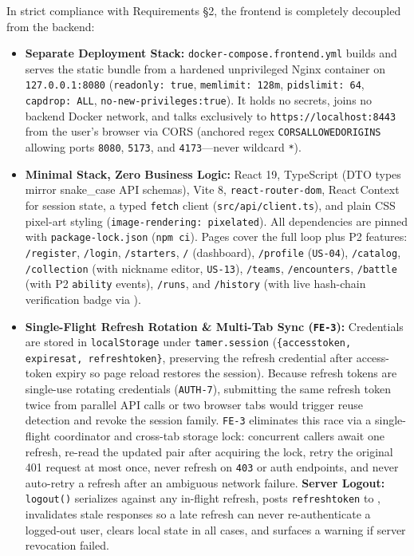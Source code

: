 \documentclass[10.5pt,a4paper]{article}
\DeclareRobustCommand{\code}[1]{\begingroup\def\_{\textunderscore\allowbreak}\texttt{#1}\endgroup}
\begin{document}
In strict compliance with Requirements §2, the frontend is completely decoupled from the backend:
\begin{itemize}
  \item \textbf{Separate Deployment Stack:} \code{docker-compose.frontend.yml} builds and serves the static bundle from a hardened unprivileged Nginx container on \code{127.0.0.1:8080} (\code{read\_only: true}, \code{mem\_limit: 128m}, \code{pids\_limit: 64}, \code{cap\_drop: ALL}, \code{no-new-privileges:true}). It holds no secrets, joins no backend Docker network, and talks exclusively to \code{https://localhost:8443} from the user's browser via CORS (anchored regex \code{CORS\_ALLOWED\_ORIGINS} allowing ports \code{8080}, \code{5173}, and \code{4173}—never wildcard \code{*}).
  \item \textbf{Minimal Stack, Zero Business Logic:} React 19, TypeScript (DTO types mirror snake\_case API schemas), Vite 8, \code{react-router-dom}, React Context for session state, a typed \code{fetch} client (\code{src/api/client.ts}), and plain CSS pixel-art styling (\code{image-rendering: pixelated}). All dependencies are pinned with \code{package-lock.json} (\code{npm ci}). Pages cover the full loop plus P2 features: \code{/register}, \code{/login}, \code{/starters}, \code{/} (dashboard), \code{/profile} (\code{US-04}), \code{/catalog}, \code{/collection} (with nickname editor, \code{US-13}), \code{/teams}, \code{/encounters}, \code{/battle} (with P2 \code{ability} events), \code{/runs}, and \code{/history} (with live hash-chain verification badge via ).
  \item \textbf{Single-Flight Refresh Rotation \& Multi-Tab Sync (\code{FE-3}):} Credentials are stored in \code{localStorage} under \code{tamer.session} (\code{\{access\_token, expires\_at, refresh\_token\}}, preserving the refresh credential after access-token expiry so page reload restores the session). Because refresh tokens are single-use rotating credentials (\code{AUTH-7}), submitting the same refresh token twice from parallel API calls or two browser tabs would trigger reuse detection and revoke the session family. \code{FE-3} eliminates this race via a single-flight coordinator and cross-tab storage lock: concurrent callers await one refresh, re-read the updated pair after acquiring the lock, retry the original 401 request at most once, never refresh on \code{403} or auth endpoints, and never auto-retry a refresh after an ambiguous network failure. \textbf{Server Logout:} \code{logout()} serializes against any in-flight refresh, posts \code{refresh\_token} to , invalidates stale responses so a late refresh can never re-authenticate a logged-out user, clears local state in all cases, and surfaces a warning if server revocation failed.

\end{itemize}
\end{document}
